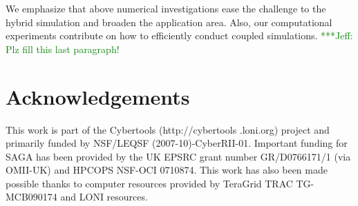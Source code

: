 \documentclass[preprint,12pt]{elsarticle}
\newcommand{\skonote}[1]{ {\textcolor{green} { ***Jeff: #1 }}}
\newcommand{\skonote}[1]{}
\begin{document}
We emphasize that above numerical investigations ease the challenge to the hybrid simulation and broaden the application area. Also, our computational experiments contribute on how to efficiently conduct coupled simulations.
\skonote{Plz fill this last paragraph!}

\section*{Acknowledgements}
This work is part of the Cybertools (http://cybertools .loni.org)
project and primarily funded by NSF/LEQSF (2007-10)-CyberRII-01.
Important funding for SAGA has been provided by the UK EPSRC grant
number GR/D0766171/1 (via OMII-UK) and HPCOPS NSF-OCI 0710874. This
work has also been made possible thanks to computer resources provided
by TeraGrid TRAC TG-MCB090174 and LONI resources.













\end{document}
